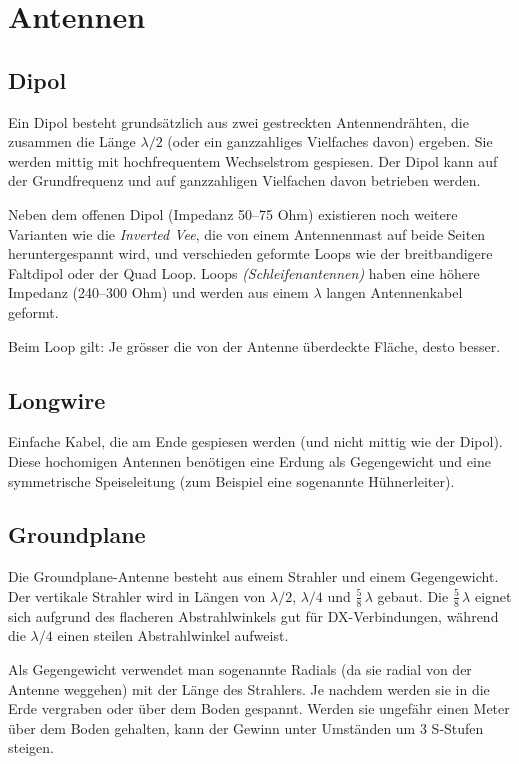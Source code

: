 \chapter{Antennen}

\section{Dipol}
Ein Dipol besteht grundsätzlich aus zwei gestreckten Antennendrähten, die zusammen die Länge $\lambda/2$ (oder ein ganzzahliges Vielfaches davon) ergeben. Sie werden mittig mit hochfrequentem Wechselstrom gespiesen. Der Dipol kann auf der Grundfrequenz und auf ganzzahligen Vielfachen davon betrieben werden.

Neben dem offenen Dipol (Impedanz 50–75 Ohm) existieren noch weitere Varianten wie die \textit{Inverted Vee}, die von einem Antennenmast auf beide Seiten heruntergespannt wird, und verschieden geformte Loops wie der breitbandigere Faltdipol oder der Quad Loop. Loops \textit{(Schleifenantennen)} haben eine höhere Impedanz (240–300 Ohm) und werden aus einem $\lambda$ langen Antennenkabel geformt.

Beim Loop gilt: Je grösser die von der Antenne überdeckte Fläche, desto besser.

\section{Longwire}
Einfache Kabel, die am Ende gespiesen werden (und nicht mittig wie der Dipol). Diese hochomigen Antennen benötigen eine Erdung als Gegengewicht und eine symmetrische Speiseleitung (zum Beispiel eine sogenannte Hühnerleiter). 

\section{Groundplane}
Die Groundplane-Antenne besteht aus einem Strahler und einem Gegengewicht. Der vertikale Strahler wird in Längen von $\lambda/2$, $\lambda/4$ und $\frac{5}{8}\,\lambda$ gebaut. Die $\frac{5}{8}\,\lambda$ eignet sich aufgrund des flacheren Abstrahlwinkels gut für DX-Verbindungen, während die  $\lambda/4$ einen steilen Abstrahlwinkel aufweist.

Als Gegengewicht verwendet man sogenannte Radials (da sie radial von der Antenne weggehen) mit der Länge des Strahlers. Je nachdem werden sie in die Erde vergraben oder über dem Boden gespannt. Werden sie ungefähr einen Meter über dem Boden gehalten, kann der Gewinn unter Umständen um 3 S-Stufen steigen.

